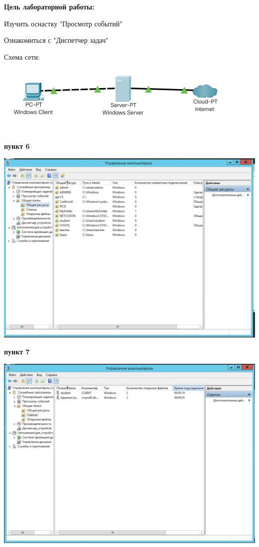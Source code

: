 \documentclass[a4paper,14pt]{extarticle}
\begin{document}
    \textbf{Цель лабораторной работы:}
    \vspace{-2em}
    \begin{enumerate}
        \begin{singlespace}
            \item Изучить оснастку "Просмотр событий"
            \item Ознакомиться с "Диспетчер задач" 
        \end{singlespace}
    \end{enumerate}

    Схема сети:
    \begin{center}
        \includegraphics{net.png}
    \end{center}

    \textbf{пункт 6}
    \begin{center}
        \includegraphics[scale=0.6]{6.png}
    \end{center}

    \newpage
    \textbf{пункт 7}
    \begin{center}
        \includegraphics[scale=0.6]{7.png}
    \end{center}
\end{document}

